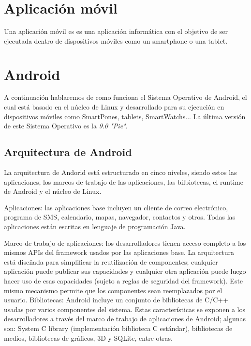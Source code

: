 
\section{Aplicación móvil}

Una aplicación móvil es es una aplicación informática con el objetivo de ser ejecutada dentro de dispositivos móviles como un smartphone o una tablet.

\section{Android}

A continuación hablaremos de como funciona el Sistema Operativo de Android, el cual está basado en el núcleo de Linux y desarrollado para su ejecución en dispositivos móviles como SmartPones, tablets, SmartWatchs...
La última versión de este Sistema Operativo es la \textit{9.0 "Pie"}.

\subsection{Arquitectura de Android}
La arquitectura de Andorid está estructurado en cinco niveles, siendo estos las aplicaciones, los marcos de trabajo de las aplicaciones, las bilbiotecas, el runtime de Android y el núcleo de Linux.

Aplicaciones: las aplicaciones base incluyen un cliente de correo electrónico, programa de SMS, calendario, mapas, navegador, contactos y otros. Todas las aplicaciones están escritas en lenguaje de programación Java.

Marco de trabajo de aplicaciones: los desarrolladores tienen acceso completo a los mismos APIs del framework usados por las aplicaciones base. La arquitectura está diseñada para simplificar la reutilización de componentes; cualquier aplicación puede publicar sus capacidades y cualquier otra aplicación puede luego hacer uso de esas capacidades (sujeto a reglas de seguridad del framework). Este mismo mecanismo permite que los componentes sean reemplazados por el usuario.
Bibliotecas: Android incluye un conjunto de bibliotecas de C/C++ usadas por varios componentes del sistema. Estas características se exponen a los desarrolladores a través del marco de trabajo de aplicaciones de Android; algunas son: System C library (implementación biblioteca C estándar), bibliotecas de medios, bibliotecas de gráficos, 3D y SQLite, entre otras.

